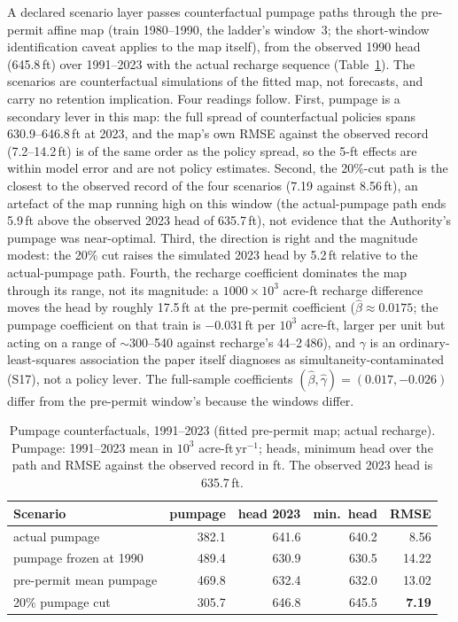 A declared scenario layer passes counterfactual pumpage paths through the pre-permit affine map (train 1980--1990, the ladder's window~3; the short-window identification caveat applies to the map itself), from the observed 1990 head (645.8\,ft) over 1991--2023 with the actual recharge sequence (Table~\ref{tab:si_pumpage}). The scenarios are counterfactual simulations of the fitted map, not forecasts, and carry no retention implication. Four readings follow. First, pumpage is a secondary lever in this map: the full spread of counterfactual policies spans 630.9--646.8\,ft at 2023, and the map's own RMSE against the observed record (7.2--14.2\,ft) is of the same order as the policy spread, so the 5-ft effects are within model error and are not policy estimates. Second, the 20\%-cut path is the closest to the observed record of the four scenarios (7.19 against 8.56\,ft), an artefact of the map running high on this window (the actual-pumpage path ends 5.9\,ft above the observed 2023 head of 635.7\,ft), not evidence that the Authority's pumpage was near-optimal. Third, the direction is right and the magnitude modest: the 20\% cut raises the simulated 2023 head by 5.2\,ft relative to the actual-pumpage path. Fourth, the recharge coefficient dominates the map through its range, not its magnitude: a $1000\times10^3$ acre-ft recharge difference moves the head by roughly 17.5\,ft at the pre-permit coefficient ($\hat\beta\approx0.0175$; the pumpage coefficient on that train is $-0.031$\,ft per $10^3$ acre-ft, larger per unit but acting on a range of $\sim$300--540 against recharge's 44--2\,486), and $\gamma$ is an ordinary-least-squares association the paper itself diagnoses as simultaneity-contaminated (S17), not a policy lever. The full-sample coefficients $(\hat\beta,\hat\gamma)=(0.017,-0.026)$ differ from the pre-permit window's because the windows differ.

\begin{table}[!htb]
\centering\small
\caption{Pumpage counterfactuals, 1991--2023 (fitted pre-permit map; actual recharge). Pumpage: 1991--2023 mean in $10^3$ acre-ft\,yr$^{-1}$; heads, minimum head over the path and RMSE against the observed record in ft. The observed 2023 head is 635.7\,ft.}
\label{tab:si_pumpage}
\begin{tabular}{@{}lrrrr@{}}
\toprule
Scenario & pumpage & head 2023 & min.\ head & RMSE \\
\midrule
actual pumpage & 382.1 & 641.6 & 640.2 & 8.56 \\
pumpage frozen at 1990 & 489.4 & 630.9 & 630.5 & 14.22 \\
pre-permit mean pumpage & 469.8 & 632.4 & 632.0 & 13.02 \\
20\% pumpage cut & 305.7 & 646.8 & 645.5 & \textbf{7.19} \\
\bottomrule
\end{tabular}
\end{table}

